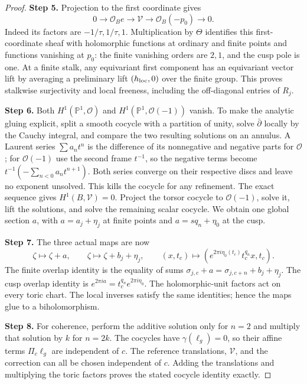 \documentclass[11pt,a4paper]{article}
\theoremstyle{plain}
\theoremstyle{definition}
\begin{document}
\begin{proof}
\par\smallskip\noindent\textbf{Step 5.} Projection to the first coordinate gives
\[
 0\longrightarrow\mathcal O_Be\longrightarrow\mathcal V
 \longrightarrow\mathcal O_B(-p_0)\longrightarrow0.
\]
Indeed its factors are $-1/\tau,1/\tau,1$. Multiplication by $\Theta$ identifies this first-coordinate sheaf with holomorphic functions at ordinary and finite points and functions vanishing at $p_0$: the finite vanishing orders are $2,1$, and the cusp pole is one. At a finite stalk, any equivariant first component has an equivariant vector lift by averaging a preliminary lift $(h_{\rm loc},0)$ over the finite group. This proves stalkwise surjectivity and local freeness, including the off-diagonal entries of $R_j$.

\par\smallskip\noindent\textbf{Step 6.} Both $H^1(\mathbb P^1,\mathcal O)$ and $H^1(\mathbb P^1,\mathcal O(-1))$ vanish. To make the analytic gluing explicit, split a smooth cocycle with a partition of unity, solve $\bar\partial$ locally by the Cauchy integral, and compare the two resulting solutions on an annulus. A Laurent series $\sum a_nt^n$ is the difference of its nonnegative and negative parts for $\mathcal O$; for $\mathcal O(-1)$ use the second frame $t^{-1}$, so the negative terms become $t^{-1}(-\sum_{n<0}a_nt^{n+1})$. Both series converge on their respective discs and leave no exponent unsolved. This kills the cocycle for any refinement. The exact sequence gives $H^1(B,\mathcal V)=0$. Project the torsor cocycle to $\mathcal O(-1)$, solve it, lift the solutions, and solve the remaining scalar cocycle. We obtain one global section $a$, with $a=a_j+\eta_j$ at finite points and $a=sq_n+\eta_0$ at the cusp.

\par\smallskip\noindent\textbf{Step 7.} The three actual maps are now
\[
 \zeta\mapsto\zeta+a,\qquad
 \zeta\mapsto\zeta+b_j+\eta_j,\qquad
 (x,t_c)\mapsto(e^{2\pi i\eta_0(t_c)}t_c^{q_n}x,t_c).
\]
The finite overlap identity is the equality of sums
$\sigma_{j,c}+a=\sigma_{j,c+n}+b_j+\eta_j$. The cusp overlap identity is $e^{2\pi ia}=t_c^{q_n}e^{2\pi i\eta_0}$. The holomorphic-unit factors act on every toric chart. The local inverses satisfy the same identities; hence the maps glue to a biholomorphism.

\par\smallskip\noindent\textbf{Step 8.} For coherence, perform the additive solution only for $n=2$ and multiply that solution by $k$ for $n=2k$. The cocycles have $\gamma(\ell_g)=0$, so their affine terms $\Pi_c\ell_g$ are independent of $c$. The reference translations, $\mathcal V$, and the correction can all be chosen independent of $c$. Adding the translations and multiplying the toric factors proves the stated cocycle identity exactly.


\end{proof}
\end{document}

